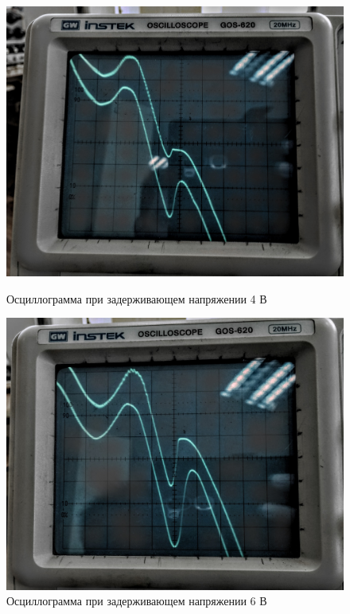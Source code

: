 \documentclass[a4paper]{article}
\begin{document}
\begin{enumerate}
\begin{figure}[h]
\begin{center}
\begin{minipage}[h]{0.45\linewidth}
\includegraphics[width=1\linewidth]{4_V.jpg}
\caption{Осциллограмма при задерживающем напряжении 4 В} %
\label{ris:experimoriginal} %
\end{minipage}
\hfill 
\begin{minipage}[h]{0.45\linewidth}
\includegraphics[width=1\linewidth]{6_V.jpg}
\caption{Осциллограмма при задерживающем напряжении 6 В}

\end{minipage}
\end{center}
\end{figure}
\end{enumerate}
\end{document}
